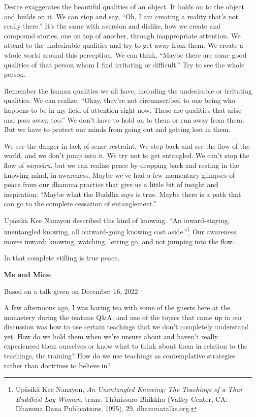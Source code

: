 Desire exaggerates the beautiful qualities of an object. It holds on to the object and builds on it. We can stop and say, ``Oh, I am creating a reality that's not really there.'' It's the same with aversion and dislike, how we create and compound stories, one on top of another, through inappropriate attention. We attend to the undesirable qualities and try to get away from them. We create a whole world around this perception. We can think, ``Maybe there are some good qualities of that person whom I find irritating or difficult.'' Try to see the whole person.~

Remember the human qualities we all have, including the undesirable or irritating qualities. We can realize, ``Okay, they're not circumscribed to one being who happens to be in my field of attention right now. These are qualities that arise and pass away, too.'' We don't have to hold on to them or run away from them. But we have to protect our minds from going out and getting lost in them.

We see the danger in lack of sense restraint. We step back and see the flow of the world, and we don't jump into it. We try not to get entangled. We can't stop the flow of \emph{saṃsāra}, but we can realize peace by dropping back and resting in the knowing mind, in awareness. Maybe we've had a few momentary glimpses of peace from our dhamma practice that give us a little bit of insight and inspiration: ``Maybe what the Buddha says is true. Maybe there is a path that can go to the complete cessation of entanglement.''~

Upāsikā Kee Nanayon described this kind of knowing. ``An inward-staying, unentangled knowing, all outward-going knowing cast aside.''\footnote{Upāsikā Kee Nanayon, \emph{An Unentangled Knowing: The Teachings of a Thai Buddhist Lay Woman}, trans. Thānissaro Bhikkhu (Valley Center, CA: Dhamma Dana Publications, 1995), 29, dhammatalks.org.} Our awareness moves inward: knowing, watching, letting go, and not jumping into the flow.~

In that complete stilling is true peace.~

\textbf{Me and Mine}

Based on a talk given on December 16, 2022

A few afternoons ago, I was having tea with some of the guests here at the monastery during the teatime Q\&A, and one of the topics that came up in our discussion was how to use certain teachings that we don't completely understand yet. How do we hold them when we're unsure about and haven't really experienced them ourselves or know what to think about them in relation to the teachings, the training? How do we use teachings as contemplative strategies rather than doctrines to believe in?

